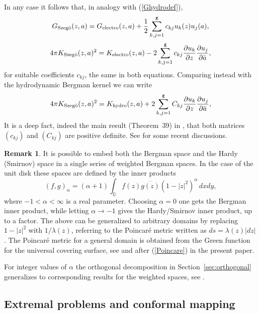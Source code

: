 \documentclass[reqno,12pt]{article}
\theoremstyle{plain}
\theoremstyle{definition}
\newtheorem{remark}[defn]{Remark}
\numberwithin{equation}{section}
\numberwithin{figure}{section}
\def\D{{\mathbb D}}
\begin{document}
In any case it follows that, in analogy with (\ref{Ghydrodef}),  
$$
{G_{\text{Szeg\"o}}}(z,a)=G_{\rm electro}(z,a)+ \frac{1}{2} \sum_{k,j=1}^{\texttt{g}}c_{kj} u_k(z){u_j(a)},
$$
$$
4\pi K_\text{Szeg\"o}(z,a)^2=K_{\rm electro}(z,a)-2\sum_{k,j=1}^{\texttt{g}}c_{kj} \frac{\partial u_k}{\partial z}\frac{\partial u_j}{\partial \bar{a}},
$$
for suitable coefficients $c_{kj}$, the same in both equations. Comparing instead with the hydrodynamic Bergman kernel we can write
$$
4\pi K_\text{Szeg\"o}(z,a)^2=K_{\rm hydro}(z,a)+2\sum_{k,j=1}^{\texttt{g}}C_{kj} \frac{\partial u_k}{\partial z}\frac{\partial u_j}{\partial \bar{a}},
$$
It is a deep fact, indeed the main result (Theorem~39) in \cite{Hejhal-1972}, that both matrices $(c_{kj})$ and $(C_{kj})$
are positive definite. See \cite{Bell-Gustafsson-2022} for some recent discussions. 

\begin{remark}\label{rem:weighted Bergman}
It is possible to embed both the Bergman space and the Hardy (Smirnov) space in a single series of weighted Bergman spaces.
In the case of the unit disk these spaces are defined by the inner products
\begin{equation}\label{weighted Bergman}
(f,g)_\alpha=(\alpha+1)\int_\D f(z)\overline{g(z)}(1-|z|^2)^{\alpha}\, dxdy,
\end{equation}  
where $-1< \alpha<\infty$ is a real parameter. Choosing $\alpha=0$ one gets the Bergman inner product, while letting
$\alpha\to -1$ gives the Hardy/Smirnov inner product, up to a factor. The above can be generalized to arbitrary domains
by replacing $1-|z|^2$ with $1/\lambda(z)$, referring to  the Poincar\'{e} metric written as $ds=\lambda(z) |dz|$. 
The Poincar\'{e} metric for a  general domain is obtained from the Green function for the universal covering surface, 
see \cite{Ahlfors-1973} and after (\ref{Poincare}) in the present paper. 

For integer values of $\alpha$ the orthogonal decomposition in Section~\ref{sec:orthogonal}  generalizes to corresponding results for
the weighted spaces, see  \cite{Gustafsson-Peetre-1990, Gustafsson-Sebbar-2012}.
\end{remark}


\subsection{Extremal problems and conformal mapping}\label{sec:capacity functions} 
\end{document}
